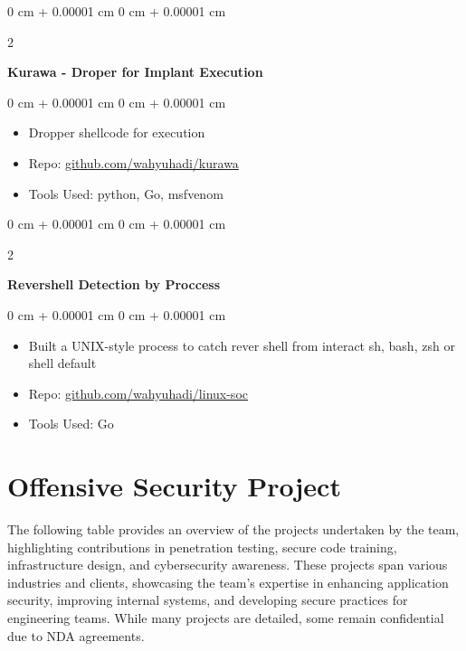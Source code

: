 \documentclass[10pt, letterpaper]{article}
\newenvironment{highlights}{
    \begin{itemize}[
        topsep=0.10 cm,
        parsep=0.10 cm,
        partopsep=0pt,
        itemsep=0pt,
        leftmargin=0 cm + 10pt
    ]
}{
    \end{itemize}
} %
\newenvironment{onecolentry}{
    \begin{adjustwidth}{
        0 cm + 0.00001 cm
    }{
        0 cm + 0.00001 cm
    }
}{
    \end{adjustwidth}
} %
\newenvironment{twocolentry}[2][]{
    \onecolentry
    \def\secondColumn{#2}
    \setcolumnwidth{\fill, 4.5 cm}
    \begin{paracol}{2}
}{
    \switchcolumn \raggedleft \secondColumn
    \end{paracol}
    \endonecolentry
} %
\begin{document}
	\begin{twocolentry}{
			
		}
		\textbf{Kurawa - Droper for Implant Execution }\end{twocolentry}
	
	\vspace{0.10 cm}
	\begin{onecolentry}
		\begin{highlights}
			\item Dropper shellcode for execution 
			\item Repo: \href{https://github.com/wahyuhadi/kurawa}{github.com/wahyuhadi/kurawa} 
			\item Tools Used: python, Go, msfvenom
		\end{highlights}
	\end{onecolentry}

        \vspace{0.2 cm}

        \begin{twocolentry}{
            
        }
            \textbf{Revershell Detection by Proccess}\end{twocolentry}

        \vspace{0.10 cm}
        \begin{onecolentry}
            \begin{highlights}
                \item Built a UNIX-style process to catch rever shell from interact sh, bash, zsh or shell default
                \item Repo: \href{https://github.com/wahyuhadi/linux-soc}{github.com/wahyuhadi/linux-soc}
                \item Tools Used: Go
            \end{highlights}
        \end{onecolentry}


	\section{Offensive Security Project}
		 \vspace{0.2 cm}
		 
	\begin{justify}
		The following table provides an overview of the projects undertaken by the team, highlighting contributions in penetration testing, secure code training, infrastructure design, and cybersecurity awareness. These projects span various industries and clients, showcasing the team's expertise in enhancing application security, improving internal systems, and developing secure practices for engineering teams. While many projects are detailed, some remain confidential due to NDA agreements.
	\end{justify}
\end{document}
